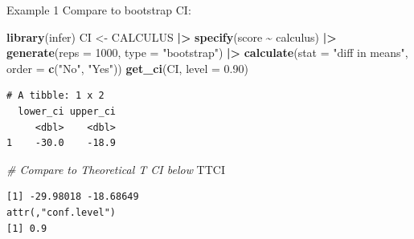 \documentclass[
  ignorenonframetext,
]{beamer}
\newenvironment{Shaded}{\begin{snugshade}}{\end{snugshade}}
\newcommand{\AttributeTok}[1]{\textcolor[rgb]{0.13,0.29,0.53}{#1}}
\newcommand{\CommentTok}[1]{\textcolor[rgb]{0.56,0.35,0.01}{\textit{#1}}}
\newcommand{\DecValTok}[1]{\textcolor[rgb]{0.00,0.00,0.81}{#1}}
\newcommand{\FloatTok}[1]{\textcolor[rgb]{0.00,0.00,0.81}{#1}}
\newcommand{\FunctionTok}[1]{\textcolor[rgb]{0.13,0.29,0.53}{\textbf{#1}}}
\newcommand{\NormalTok}[1]{#1}
\newcommand{\OtherTok}[1]{\textcolor[rgb]{0.56,0.35,0.01}{#1}}
\newcommand{\SpecialCharTok}[1]{\textcolor[rgb]{0.81,0.36,0.00}{\textbf{#1}}}
\newcommand{\StringTok}[1]{\textcolor[rgb]{0.31,0.60,0.02}{#1}}
\begin{document}
\begin{frame}[fragile]{Example 1}
\protect\hypertarget{example-1-4}{}
Compare to bootstrap CI: \tiny

\begin{Shaded}
\begin{Highlighting}[]
\FunctionTok{library}\NormalTok{(infer)}
\NormalTok{CI }\OtherTok{\textless{}{-}}\NormalTok{ CALCULUS }\SpecialCharTok{|\textgreater{}} 
  \FunctionTok{specify}\NormalTok{(score }\SpecialCharTok{\textasciitilde{}}\NormalTok{ calculus) }\SpecialCharTok{|\textgreater{}} 
  \FunctionTok{generate}\NormalTok{(}\AttributeTok{reps =} \DecValTok{1000}\NormalTok{, }\AttributeTok{type =} \StringTok{"bootstrap"}\NormalTok{) }\SpecialCharTok{|\textgreater{}} 
  \FunctionTok{calculate}\NormalTok{(}\AttributeTok{stat =} \StringTok{"diff in means"}\NormalTok{, }\AttributeTok{order =} \FunctionTok{c}\NormalTok{(}\StringTok{"No"}\NormalTok{, }\StringTok{"Yes"}\NormalTok{))}
\FunctionTok{get\_ci}\NormalTok{(CI, }\AttributeTok{level =} \FloatTok{0.90}\NormalTok{)}
\end{Highlighting}
\end{Shaded}

\begin{verbatim}
# A tibble: 1 x 2
  lower_ci upper_ci
     <dbl>    <dbl>
1    -30.0    -18.9
\end{verbatim}

\begin{Shaded}
\begin{Highlighting}[]
\CommentTok{\# Compare to Theoretical T CI below}
\NormalTok{TTCI}
\end{Highlighting}
\end{Shaded}

\begin{verbatim}
[1] -29.98018 -18.68649
attr(,"conf.level")
[1] 0.9
\end{verbatim}

\normalsize
\end{frame}
\end{document}
